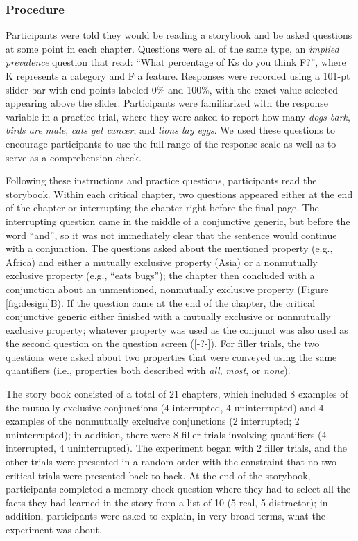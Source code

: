 \documentclass[10pt,letterpaper]{article}
\newcommand{\red}[1]{{\textcolor{Red}{#1}}}
\begin{document}
\subsubsection{Procedure}
Participants were told they would be reading a storybook and be asked questions at some point in each chapter. 
Questions were all of the same type, an \emph{implied prevalence} question \cite{Gelman2002, Cimpian2010} that read: ``What percentage of Ks do you think F?'', where K represents a category and F a feature. 
Responses were recorded using a 101-pt slider bar with end-points labeled 0\% and 100\%, with the exact value selected appearing above the slider. 
Participants were familiarized with the response variable in a practice trial, where they were asked to report how many \emph{dogs bark}, \emph{birds are male}, \emph{cats get cancer}, and \emph{lions lay eggs}. 
We used these questions to encourage participants to use the full range of the response scale as well as to serve as a comprehension check. 

Following these instructions and practice questions, participants read the storybook.
Within each critical chapter, two questions appeared either at the end of the chapter or interrupting the chapter right before the final page.
The interrupting question came in the middle of a conjunctive generic, but before the word ``and'', so it was not immediately clear that the sentence would continue with a conjunction.
The questions asked about the mentioned property (e.g., Africa) and either a mutually exclusive property (Asia) or a nonmutually exclusive property (e.g., ``eats bugs''); the chapter then concluded with a conjunction about an unmentioned, nonmutually exclusive property (Figure \ref{fig:design}B).
If the question came at the end of the chapter, the critical conjunctive generic either finished with a mutually exclusive or nonmutually exclusive property; whatever property was used as the conjunct was also used as the second question on the question screen ([-?-]).
For filler trials, the two questions were asked about two properties that were conveyed using the same quantifiers (i.e., properties both described with \emph{all}, \emph{most}, or \emph{none}).

The story book consisted of a total of 21 chapters, which included 8 examples of the mutually exclusive conjunctions (4 interrupted, 4 uninterrupted) and 4 examples of the nonmutually exclusive conjunctions (2 interrupted; 2 uninterrupted); in addition, there were 8 filler trials involving quantifiers (4 interrupted, 4 uninterrupted). 
The experiment began with 2 filler trials, and the other trials were presented in a random order with the constraint that no two critical trials were presented back-to-back. 
At the end of the storybook, participants completed a memory check question where they had to select all the facts they had learned in the story from a list of 10 (5 real, 5 distractor); in addition, participants were asked to explain, in very broad terms, what the experiment was about.
\end{document}
